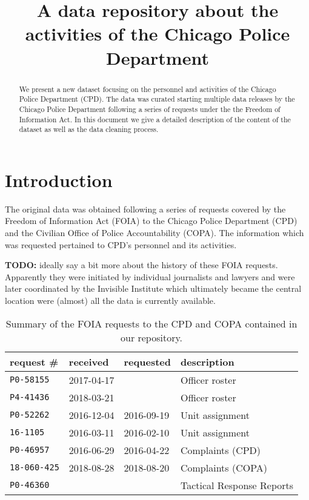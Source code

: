 \documentclass{article}
\title{A data repository about the activities of the Chicago Police Department}
\begin{document}
\maketitle

\begin{abstract}
	We present a new dataset focusing on the personnel and activities of the
	Chicago Police Department (CPD). The data was curated starting multiple
	data releases by the Chicago Police Department following a series of
	requests under the the Freedom of Information Act. In this document we give
	a detailed description of the content of the dataset as well as the data
	cleaning process.
\end{abstract}

\section{Introduction}

The original data was obtained following a series of requests covered by the
Freedom of Information Act (FOIA) to the Chicago Police Department (CPD) and
the Civilian Office of Police Accountability (COPA). The information which was
requested pertained to CPD's personnel and its activities.

\textbf{TODO:} ideally say a bit more about the history of these FOIA requests.
Apparently they were initiated by individual journalists and lawyers and were
later coordinated by the Invisible Institute which ultimately became the
central location were (almost) all the data is currently available.

\begin{table}[h]
	\begin{center}
\begin{tabular}{@{}llll@{}}
	\toprule
	request \#&received&requested&description\\
\midrule
	\texttt{P0-58155}&2017-04-17& &Officer roster\\
	\texttt{P4-41436}&2018-03-21& &Officer roster\\
		\texttt{P0-52262}&2016-12-04&2016-09-19&Unit assignment\\
		\texttt{16-1105}&2016-03-11&2016-02-10&Unit assignment\\
	\texttt{P0-46957}&2016-06-29&2016-04-22&Complaints (CPD)\\
	\texttt{18-060-425}&2018-08-28&2018-08-20&Complaints (COPA)\\
	\texttt{P0-46360}& & &Tactical Response Reports\\
\bottomrule
\end{tabular}
\caption{Summary of the FOIA requests to the CPD and COPA contained in our repository.}
\label{table:summary}
\end{center}
\end{table}
\end{document}
